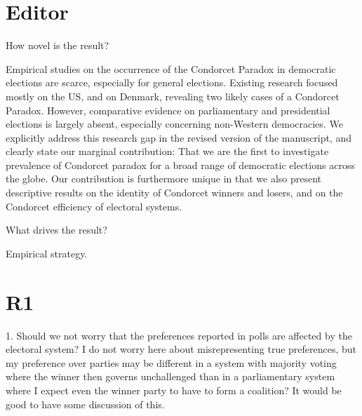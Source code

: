 \documentclass[a4paper, 12pt]{scrartcl}
\theoremstyle{break}
\newenvironment{changes}{\par\color{violet}\par\addvspace{\baselineskip}}{\par\addvspace{\baselineskip}}
\begin{document}
\section{Editor}
\begin{changes}
How novel is the result?
\end{changes}
Empirical studies on the occurrence of the Condorcet Paradox in democratic elections are scarce, especially for general elections. Existing research focused mostly on the US, and on Denmark, revealing two likely cases of a Condorcet Paradox. However, comparative evidence on parliamentary and presidential elections is largely absent, especially concerning non-Western democracies. We explicitly address this research gap in the revised version of the manuscript, and clearly state our marginal contribution: That we are the first to investigate prevalence of Condorcet paradox for a broad range of democratic elections across the globe. Our contribution is furthermore unique in that we also present descriptive results on the identity of Condorcet winners and losers, and on the Condorcet efficiency of electoral systems. 

\begin{changes}
	What drives the result?
\end{changes}


\begin{changes}
	Empirical strategy.
\end{changes}

\section{R1} 
\begin{changes}
1. Should we not worry that the preferences reported in polls are affected by the electoral system? I do not worry here about misrepresenting true preferences, but my preference over parties may be different in a system with majority voting where the winner then governs unchallenged than in a parliamentary system where I expect even the winner party to have to form a coalition? It would be good to have some discussion of this.
\end{changes}
\end{document}
